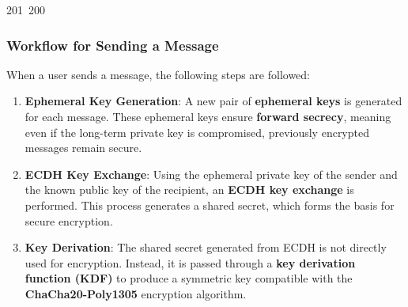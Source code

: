 201~200~\documentclass{article}
\begin{document}
	                                                                                                                                                                                                                \subsubsection{Workflow for Sending a Message}

	                                                                                                                                                                                                                When a user sends a message, the following steps are followed:

	                                                                                                                                                                                                                \begin{enumerate}
	                                                                                                                                                                                                                    \item \textbf{Ephemeral Key Generation}: A new pair of \textbf{ephemeral keys} is generated for each message. These ephemeral keys ensure \textbf{forward secrecy}, meaning even if the long-term private key is compromised, previously encrypted messages remain secure.

	                                                                                                                                                                                                                            \item \textbf{ECDH Key Exchange}: Using the ephemeral private key of the sender and the known public key of the recipient, an \textbf{ECDH key exchange} is performed. This process generates a shared secret, which forms the basis for secure encryption.

	                                                                                                                                                                                                                                    \item \textbf{Key Derivation}: The shared secret generated from ECDH is not directly used for encryption. Instead, it is passed through a \textbf{key derivation function (KDF)} to produce a symmetric key compatible with the \textbf{ChaCha20-Poly1305} encryption algorithm.


\end{enumerate}
\end{document}
